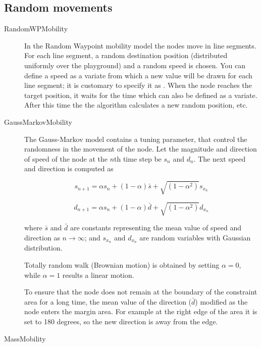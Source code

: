\subsection{Random movements}

\begin{description}

\item[RandomWPMobility]

In the Random Waypoint mobility model the nodes move in line segments. For each
line segment, a random destination position (distributed uniformly over the
playground) and a random speed is chosen. You can define a speed as a variate
from which a new value will be drawn for each line segment; it is customary to
specify it as . When the node reaches the
target position, it waits for the time  which can also be defined as a
variate. After this time the the algorithm calculates a new random position, etc.

\item[GaussMarkovMobility] The Gauss-Markov model contains a tuning
parameter, that control the randomness in the movement of the node.
Let the magnitude and direction of speed of the node at the $n$th time step be
$s_n$ and $d_n$. The next speed and direction is computed as

$$ s_{n+1} = \alpha s_n + (1 - \alpha) \bar{s} +
             \sqrt{(1-\alpha^2)} s_{x_n} $$

$$ d_{n+1} = \alpha s_n + (1 - \alpha) \bar{d} +
             \sqrt{(1-\alpha^2)} d_{x_n} $$

where $\bar{s}$ and $\bar{d}$ are constants representing the mean value
of speed and direction as $n \to \infty$; and $s_{x_n}$ and $d_{x_n}$
are random variables with Gaussian distribution.

Totally random walk (Brownian motion) is obtained by setting $\alpha=0$,
while $\alpha=1$ results a linear motion.

To ensure that the node does not remain at the boundary of the constraint
area for a long time, the mean value of the direction ($\bar{d}$) modified
as the node enters the margin area. For example at the right edge of the
area it is set to 180 degrees, so the new direction is away from the edge.


\item[MassMobility]


\end{description}
